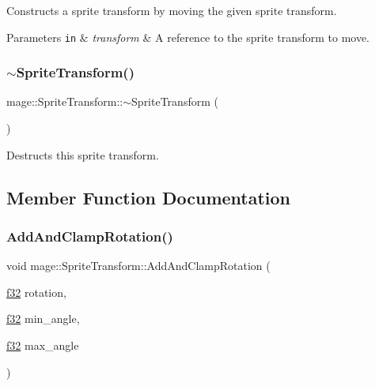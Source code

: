 Constructs a sprite transform by moving the given sprite transform.


\begin{DoxyParams}[1]{Parameters}
\mbox{\tt in}  & {\em transform} & A reference to the sprite transform to move. \\
\hline
\end{DoxyParams}
\hypertarget{structmage_1_1_sprite_transform_a14a3614023996cbb071c3de99f9528bc}{}\label{structmage_1_1_sprite_transform_a14a3614023996cbb071c3de99f9528bc} 
\subsubsection{\texorpdfstring{$\sim$\+Sprite\+Transform()}{~SpriteTransform()}}
{\footnotesize\ttfamily mage\+::\+Sprite\+Transform\+::$\sim$\+Sprite\+Transform (\begin{DoxyParamCaption}{ }\end{DoxyParamCaption})\hspace{0.3cm}{\ttfamily [default]}}

Destructs this sprite transform. 

\subsection{Member Function Documentation}
\hypertarget{structmage_1_1_sprite_transform_a05d54e928fd6ee81d875ad712e7299c9}{}\label{structmage_1_1_sprite_transform_a05d54e928fd6ee81d875ad712e7299c9} 
\subsubsection{\texorpdfstring{Add\+And\+Clamp\+Rotation()}{AddAndClampRotation()}}
{\footnotesize\ttfamily void mage\+::\+Sprite\+Transform\+::\+Add\+And\+Clamp\+Rotation (\begin{DoxyParamCaption}\item[{\hyperlink{namespacemage_a6a44ad388483959dc4dff9f2aef91431}{f32}}]{rotation,  }\item[{\hyperlink{namespacemage_a6a44ad388483959dc4dff9f2aef91431}{f32}}]{min\+\_\+angle,  }\item[{\hyperlink{namespacemage_a6a44ad388483959dc4dff9f2aef91431}{f32}}]{max\+\_\+angle }\end{DoxyParamCaption})\hspace{0.3cm}{\ttfamily [noexcept]}}

